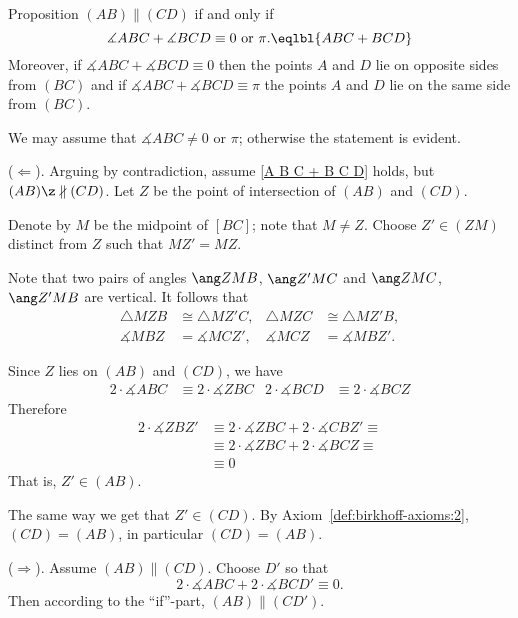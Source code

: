 {\begin{thm}{Proposition}\label{prop:parallel-2}
$(AB)\parallel(C D)$ if and only if 
$$\measuredangle A B C+\measuredangle B C D\equiv 0\ \text{or}\ \pi.\eqlbl{A B C + B C D}$$ 
Moreover, if $\measuredangle A B C+\measuredangle B C D\equiv 0$
then the points $A$ and $D$ lie on opposite sides from $(BC)$ 
and if $\measuredangle A B C+\measuredangle B C D\equiv \pi$
 the points $A$ and $D$ lie on the same side from $(BC)$.
\end{thm}

We may assume that $\measuredangle ABC\ne 0$ or $\pi$;
otherwise the statement is evident. 

\parit{}($\Leftarrow$).
Arguing by contradiction, 
assume \ref{A B C + B C D} holds, but $(AB)\z\nparallel(C D)$.
Let $Z$ be the point of intersection of $(AB)$ and $(CD)$.

Denote by $M$ be the midpoint of $[BC]$; note that $M\ne Z$.
Choose $Z'\in (ZM)$ distinct from $Z$ such that $MZ'=MZ$.

Note that two pairs of angles 
$\ang ZMB$, $\ang Z'MC$
and
$\ang ZMC$, $\ang Z'MB$
are vertical.
It follows that
\begin{align*}
\triangle MZB&\cong \triangle MZ'C,
& 
\triangle MZC&\cong \triangle MZ'B,
\\
\measuredangle MBZ&=\measuredangle MCZ',
&
\measuredangle MCZ&=\measuredangle MBZ'.
\end{align*}

Since $Z$ lies on $(AB)$ and $(CD)$,
we have
\begin{align*}
2\cdot\measuredangle ABC&\equiv 2\cdot\measuredangle ZBC
&
2\cdot\measuredangle BCD &\equiv 2\cdot\measuredangle BCZ
\end{align*}
Therefore
\begin{align*}
2\cdot\measuredangle ZBZ'
&\equiv 2\cdot \measuredangle ZBC+2\cdot \measuredangle CBZ'\equiv
\\
&\equiv 2\cdot \measuredangle ZBC+2\cdot \measuredangle BCZ\equiv
\\
&\equiv 0
\end{align*}
That is, $Z'\in (AB)$.

The same way we get that $Z'\in (CD)$.
By Axiom~\ref{def:birkhoff-axioms:2}, $(CD)=(AB)$,
in particular $(CD)=(AB)$.

\parit{}($\Rightarrow$). Assume $(AB)\parallel(C D)$.
Choose $D'$ so that 
$$2\cdot \measuredangle A B C+2\cdot \measuredangle B C D'\equiv 0.$$
Then according to the ``if''-part, $(AB)\parallel (CD')$.

}
